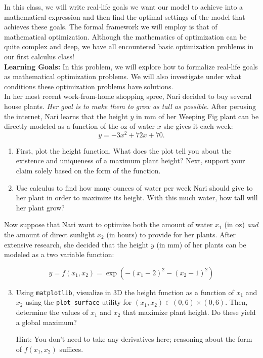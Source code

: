 \documentclass{../harvardml}
\theoremstyle{definition}
\theoremstyle{plain}
\begin{document}
\begin{problem}
In this class, we will write real-life goals we want our model to achieve into a mathematical expression and then find the optimal settings of the model that achieves these goals. The formal framework we will employ is that of mathematical optimization. Although the mathematics of optimization can be quite complex and deep, we have all encountered basic optimization problems in our first calculus class!\\

\noindent \textbf{Learning Goals:} In this problem, we will explore how to formalize real-life goals as mathematical optimization problems. We will also investigate under what conditions these optimization problems have solutions.\\

\noindent In her most recent work-from-home shopping spree, Nari decided to buy several house plants. \textit{Her goal is to make them to grow as tall as possible.} After perusing the internet, Nari learns that the height $y$ in mm of her Weeping Fig plant can be directly modeled as a function of the oz of water $x$ she gives it each week:
$$y = - 3x^2 + 72x + 70.$$
\begin{enumerate}
    \item First, plot the height function. What does the plot tell you about the existence and uniqueness of a maximum plant height? Next, support your claim solely based on the form of the function.

    \item Use calculus to find how many ounces of water per week Nari should give to her plant in order to maximize its height. With this much water, how tall will her plant grow?

\end{enumerate}
Now suppose that Nari want to optimize both the amount of water $x_1$ (in oz) \textit{and} the amount of direct sunlight $x_2$ (in hours) to provide for her plants. After extensive research, she decided that the height $y$ (in mm) of her plants can be modeled as a two variable function:

$$y = f(x_1, x_2) = \exp\left(-(x_1 - 2)^2 - (x_2 - 1)^2 \right)$$
\begin{enumerate}
    \setcounter{enumi}{2}
    \item Using \texttt{matplotlib}, visualize in 3D the height function as a function of $x_1$ and $x_2$ using the \texttt{plot\_surface} utility for $(x_1, x_2) \in (0, 6) \times (0, 6)$. Then, determine the values of $x_1$ and $x_2$ that maximize plant height. Do these yield a global maximum? 
    
    Hint: You don't need to take any derivatives here; reasoning about the form of $f(x_1, x_2)$ suffices.
\end{enumerate}
\end{problem}
\end{document}
